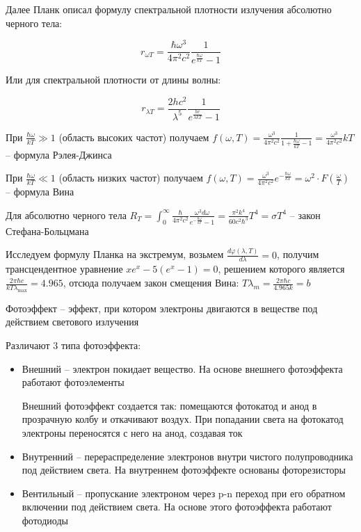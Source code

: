\documentclass[12pt]{article}
\begin{document}
Далее Планк описал формулу спектральной плотности излучения абсолютно черного тела:

\[r_{\omega T} = \frac{\hbar \omega^3}{4 \pi^2 c^2} \frac{1}{e^{\frac{\hbar \omega}{kT}} - 1}\]

Или для спектральной плотности от длины волны:

\[r_{\lambda T} = \frac{2 h c^2}{\lambda^5} \frac{1}{e^{\frac{hc}{\lambda kT}} - 1}\]

При $\frac{\hbar \omega}{kT} \gg 1$ (область высоких частот) получаем $f(\omega, T) = \frac{\omega^3}{4\pi^2 c^2} \frac{1}{1 + \frac{\hbar \omega}{kT} - 1} = \frac{\omega^3}{4\pi^2 c^2} kT$ -- формула Рэлея-Джинса

При $\frac{\hbar \omega}{kT} \ll 1$ (область низких частот) получаем $f(\omega, T) = \frac{\omega^3}{4\pi^2 c^2} e^{-\frac{\hbar \omega}{k T}} = \omega^2 \cdot F\left(\frac{\omega}{T}\right)$ -- формула Вина

Для абсолютно черного тела $R_T = \int_0^\infty \frac{\hbar}{4\pi^2 c^2} \frac{\omega^3 d\omega}{e^{-\frac{\hbar \omega}{k T}} - 1} = \frac{\pi^2 k^4}{60 c^2 \hbar^3} T^4 = \sigma T^4$ -- закон Стефана-Больцмана

\smallvspace 

Исследуем формулу Планка на экстремум, возьмем $\frac{d \varphi(\lambda, T)}{d\lambda} = 0$, получим трансцендентное уравнение $x e^x - 5(e^x - 1) = 0$, решением которого является $\frac{2\pi \hbar c}{k T \lambda_{\max}} = 4.965$, отсюда получаем закон смещения Вина: $T \lambda_m = \frac{2\pi \hbar c}{4.965 k} = b$

\bigvspace

Фотоэффект -- эффект, при котором электроны двигаются в веществе под действием светового излучения

Различают 3 типа фотоэффекта:

\begin{itemize}
    \item Внешний -- электрон покидает вещество. На основе внешнего фотоэффекта работают фотоэлементы
    
    Внешний фотоэффект создается так: помещаются фотокатод и анод в прозрачную колбу и откачивают воздух. При попадании света на фотокатод электроны переносятся с него на анод, создавая ток 

    \item Внутренний -- перераспределение электронов внутри чистого полупроводника под действием света. На внутреннем фотоэффекте основаны фоторезисторы

    \item Вентильный -- пропускание электроном через p-n переход при его обратном включении под действием света. На основе этого фотоэффекта работают фотодиоды
\end{itemize}
\end{document}
